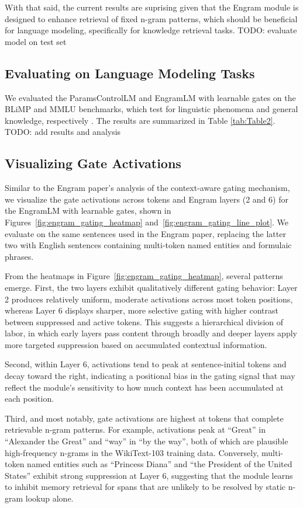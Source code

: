 \documentclass[11pt]{article}
\begin{document}
With that said, the current results are suprising given that the Engram module is designed to enhance retrieval of fixed n-gram patterns, which should be beneficial for language modeling, specifically for knowledge retrieval tasks.
TODO: evaluate model on test set

\subsection{Evaluating on Language Modeling Tasks}

We evaluated the ParamsControlLM and EngramLM with learnable gates on the BLiMP and MMLU benchmarks, which test for linguistic phenomena and general knowledge, respectively \cite{warstadt-etal-2020-blimp-benchmark,hendrycks2021measuringmassivemultitasklanguage}.
The results are summarized in Table \ref{tab:Table2}.
TODO: add results and analysis

\subsection{Visualizing Gate Activations}
Similar to the Engram paper's analysis of the context-aware gating mechanism, we visualize the gate activations across tokens and Engram layers (2 and 6)
for the EngramLM with learnable gates, shown in Figures~\ref{fig:engram_gating_heatmap} and~\ref{fig:engram_gating_line_plot}.
We evaluate on the same sentences used in the Engram paper, replacing the latter two with English sentences containing multi-token named entities and formulaic phrases.

From the heatmaps in Figure~\ref{fig:engram_gating_heatmap}, several patterns emerge.
First, the two layers exhibit qualitatively different gating behavior: Layer 2 produces relatively uniform, moderate activations across most token positions, whereas Layer 6 displays sharper, more selective gating with higher contrast between suppressed and active tokens.
This suggests a hierarchical division of labor, in which early layers pass content through broadly and deeper layers apply more targeted suppression based on accumulated contextual information.

Second, within Layer 6, activations tend to peak at sentence-initial tokens and decay toward the right, indicating a positional bias in the gating signal that may reflect the module's sensitivity to how much context has been accumulated at each position.

Third, and most notably, gate activations are highest at tokens that complete retrievable n-gram patterns.
For example, activations peak at ``Great'' in ``Alexander the Great'' and ``way'' in ``by the way'', both of which are plausible high-frequency n-grams in the WikiText-103 training data.
Conversely, multi-token named entities such as ``Princess Diana'' and ``the President of the United States'' exhibit strong suppression at Layer 6, suggesting that the module learns to inhibit memory retrieval for spans that are unlikely to be resolved by static n-gram lookup alone.
\end{document}
